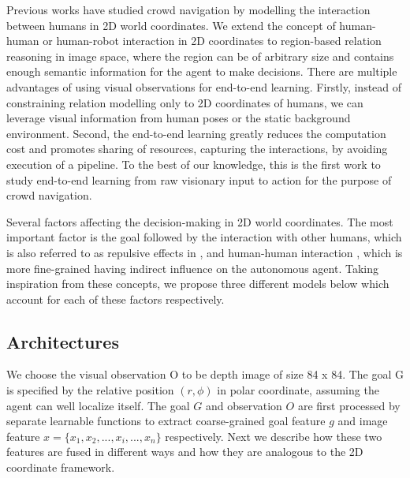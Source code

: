\documentclass[10pt,twocolumn,letterpaper]{article}
\begin{document}
Previous works \cite{helbing_social_1995, alahi_social_2016, chen_crowd-robot_2018} have studied crowd navigation by modelling the interaction between humans in 2D world coordinates. We extend the concept of human-human or human-robot interaction in 2D coordinates to region-based relation reasoning in image space, where the region can be of arbitrary size and contains enough semantic information for the agent to make decisions. There are multiple advantages of using visual observations for end-to-end learning. Firstly, instead of constraining relation modelling only to 2D coordinates of humans, we can leverage visual information from human poses or the static background environment. Second, the end-to-end learning greatly reduces the computation cost and promotes sharing of resources, capturing the interactions, by avoiding execution of a pipeline. To the best of our knowledge, this is the first work to study end-to-end learning from raw visionary input to action for the purpose of crowd navigation. 

Several factors affecting the decision-making in 2D world coordinates. The most important factor is the goal followed by the interaction with other humans, which is also referred to as repulsive effects in \cite{helbing_social_1995}, and human-human interaction \cite{alahi_social_2016, chen_crowd-robot_2018}, which is more fine-grained having indirect influence on the autonomous agent. Taking inspiration from these concepts, we propose three different models below which account for each of these factors respectively. 


\subsection{Architectures}
 We choose the visual observation O to be depth image of size 84 x 84. The goal G is specified by the relative position $(r, \phi)$ in polar coordinate, assuming the agent can well localize itself. The goal $G$ and observation $O$ are first processed by separate learnable functions to extract coarse-grained  goal feature $g$ and image feature $x=\{x_1, x_2, ..., x_i, ..., x_n\}$ respectively. Next we describe how these two features are fused in different ways and how they are analogous to the 2D coordinate framework.
\end{document}
